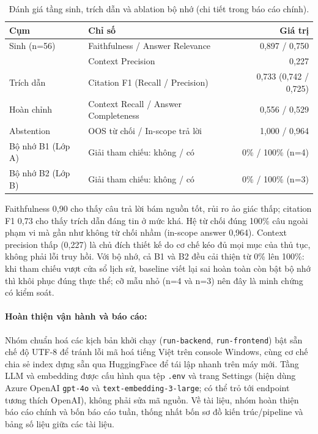 \documentclass[11pt]{article}
\begin{document}
\begin{table}[H]
\centering\small
\renewcommand{\arraystretch}{1.2}
\begin{tabular}{@{}llr@{}}
\toprule
Cụm & Chỉ số & Giá trị \\
\midrule
Sinh (n=56) & Faithfulness / Answer Relevance & 0,897 / 0,750 \\
            & Context Precision & 0,227 \\
Trích dẫn & Citation F1 (Recall / Precision) & 0,733 (0,742 / 0,725) \\
Hoàn chỉnh & Context Recall / Answer Completeness & 0,556 / 0,529 \\
Abstention & OOS từ chối / In-scope trả lời & 1,000 / 0,964 \\
\midrule
Bộ nhớ B1 (Lớp A) & Giải tham chiếu: không / có & 0\% / 100\% (n=4) \\
Bộ nhớ B2 (Lớp B) & Giải tham chiếu: không / có & 0\% / 100\% (n=3) \\
\bottomrule
\end{tabular}
\caption{Đánh giá tầng sinh, trích dẫn và ablation bộ nhớ (chi tiết trong báo cáo chính).}
\label{tab:w4-eval}
\end{table}

\noindent Faithfulness 0,90 cho thấy câu trả lời bám nguồn tốt, rủi ro ảo giác thấp; citation
F1 0,73 cho thấy trích dẫn đáng tin ở mức khá. Hệ từ chối đúng 100\% câu ngoài phạm vi mà gần
như không từ chối nhầm (in-scope answer 0,964). Context precision thấp (0,227) là chủ đích thiết
kế do cơ chế kéo đủ mọi mục của thủ tục, không phải lỗi truy hồi. Với bộ nhớ, cả B1 và B2 đều
cải thiện từ 0\% lên 100\%: khi tham chiếu vượt cửa sổ lịch sử, baseline viết lại sai hoàn toàn
còn bật bộ nhớ thì khôi phục đúng thực thể; cỡ mẫu nhỏ (n=4 và n=3) nên đây là minh chứng có
kiểm soát.

\paragraph{Hoàn thiện vận hành và báo cáo: }
Nhóm chuẩn hoá các kịch bản khởi chạy (\texttt{run-backend}, \texttt{run-frontend}) bật sẵn chế
độ UTF-8 để tránh lỗi mã hoá tiếng Việt trên console Windows, cùng cơ chế chia sẻ index dựng
sẵn qua HuggingFace để tái lập nhanh trên máy mới. Tầng LLM và embedding được cấu hình qua tệp
\texttt{.env} và trang Settings (hiện dùng Azure OpenAI \texttt{gpt-4o} và
\texttt{text-embedding-3-large}; có thể trỏ tới endpoint tương thích OpenAI), không phải sửa mã
nguồn. Về tài liệu, nhóm hoàn thiện báo cáo chính và bốn báo cáo tuần, thống nhất bốn sơ đồ
kiến trúc/pipeline và bảng số liệu giữa các tài liệu.
\end{document}
